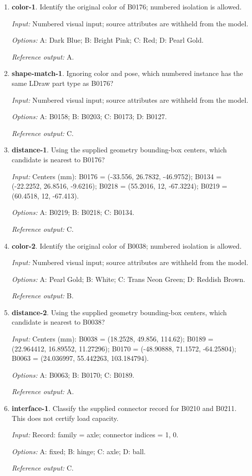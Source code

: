 \begin{enumerate}
\item \textbf{color-1}. Identify the original color of B0176; numbered isolation is allowed.\par {\small \textit{Input:} Numbered visual input; source attributes are withheld from the model. \par\textit{Options:} A: Dark Blue; B: Bright Pink; C: Red; D: Pearl Gold. \par\textit{Reference output:} A.}
\item \textbf{shape-match-1}. Ignoring color and pose, which numbered instance has the same LDraw part type as B0176?\par {\small \textit{Input:} Numbered visual input; source attributes are withheld from the model. \par\textit{Options:} A: B0158; B: B0203; C: B0173; D: B0127. \par\textit{Reference output:} C.}
\item \textbf{distance-1}. Using the supplied geometry bounding-box centers, which candidate is nearest to B0176?\par {\small \textit{Input:} Centers (mm): B0176 = (-33.556, 26.7832, -46.9752); B0134 = (-22.2252, 26.8516, -9.6216); B0218 = (55.2016, 12, -67.3224); B0219 = (60.4518, 12, -67.413). \par\textit{Options:} A: B0219; B: B0218; C: B0134. \par\textit{Reference output:} C.}
\item \textbf{color-2}. Identify the original color of B0038; numbered isolation is allowed.\par {\small \textit{Input:} Numbered visual input; source attributes are withheld from the model. \par\textit{Options:} A: Pearl Gold; B: White; C: Trans Neon Green; D: Reddish Brown. \par\textit{Reference output:} B.}
\item \textbf{distance-2}. Using the supplied geometry bounding-box centers, which candidate is nearest to B0038?\par {\small \textit{Input:} Centers (mm): B0038 = (18.2528, 49.856, 114.62); B0189 = (22.964412, 16.89552, 11.27296); B0170 = (-48.90888, 71.1572, -64.25804); B0063 = (24.036997, 55.442263, 103.184794). \par\textit{Options:} A: B0063; B: B0170; C: B0189. \par\textit{Reference output:} A.}
\item \textbf{interface-1}. Classify the supplied connector record for B0210 and B0211. This does not certify load capacity.\par {\small \textit{Input:} Record: family = axle; connector indices = 1, 0. \par\textit{Options:} A: fixed; B: hinge; C: axle; D: ball. \par\textit{Reference output:} C.}

\end{enumerate}
